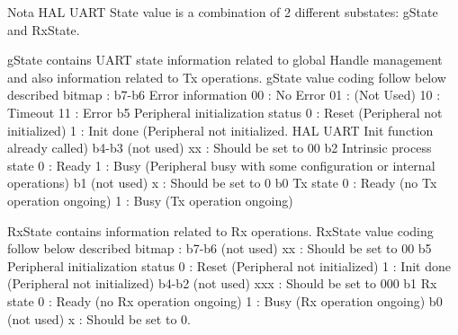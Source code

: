 \begin{DoxyNote}{Nota}
H\+AL U\+A\+RT State value is a combination of 2 different substates\+: g\+State and Rx\+State.
\begin{DoxyItemize}
\item g\+State contains U\+A\+RT state information related to global Handle management and also information related to Tx operations. g\+State value coding follow below described bitmap \+: b7-\/b6 Error information 00 \+: No Error 01 \+: (Not Used) 10 \+: Timeout 11 \+: Error b5 Peripheral initialization status 0 \+: Reset (Peripheral not initialized) 1 \+: Init done (Peripheral not initialized. H\+AL U\+A\+RT Init function already called) b4-\/b3 (not used) xx \+: Should be set to 00 b2 Intrinsic process state 0 \+: Ready 1 \+: Busy (Peripheral busy with some configuration or internal operations) b1 (not used) x \+: Should be set to 0 b0 Tx state 0 \+: Ready (no Tx operation ongoing) 1 \+: Busy (Tx operation ongoing)
\item Rx\+State contains information related to Rx operations. Rx\+State value coding follow below described bitmap \+: b7-\/b6 (not used) xx \+: Should be set to 00 b5 Peripheral initialization status 0 \+: Reset (Peripheral not initialized) 1 \+: Init done (Peripheral not initialized) b4-\/b2 (not used) xxx \+: Should be set to 000 b1 Rx state 0 \+: Ready (no Rx operation ongoing) 1 \+: Busy (Rx operation ongoing) b0 (not used) x \+: Should be set to 0. 
\end{DoxyItemize}
\end{DoxyNote}
